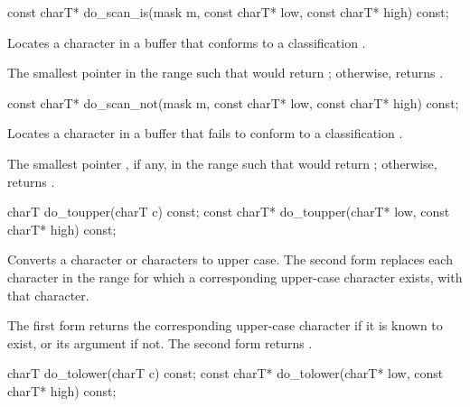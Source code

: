 %
%
\begin{itemdecl}
const charT* do_scan_is(mask m,
                       const charT* low, const charT* high) const;
\end{itemdecl}

\begin{itemdescr}
\pnum
\effects
Locates a character in a buffer that conforms to a classification
.

\pnum
\returns
The smallest pointer  in the range
\tcode{[low, high)}
such that
would return
;
otherwise, returns .
\end{itemdescr}

%
%
\begin{itemdecl}
const charT* do_scan_not(mask m,
                        const charT* low, const charT* high) const;
\end{itemdecl}

\begin{itemdescr}
\pnum
\effects
Locates a character in a buffer that fails to conform to a classification
.

\pnum
\returns
The smallest pointer , if any, in the range
such that
would return
;
otherwise, returns .
\end{itemdescr}

%
%
\begin{itemdecl}
charT        do_toupper(charT c) const;
const charT* do_toupper(charT* low, const charT* high) const;
\end{itemdecl}

\begin{itemdescr}
\pnum
\effects
Converts a character or characters to upper case.
The second form replaces each character
in the range
for which a corresponding upper-case character exists, with
that character.

\pnum
\returns
The first form returns the corresponding upper-case character if it
is known to exist, or its argument if not.
The second form returns .
\end{itemdescr}

%
%
\begin{itemdecl}
charT        do_tolower(charT c) const;
const charT* do_tolower(charT* low, const charT* high) const;
\end{itemdecl}

